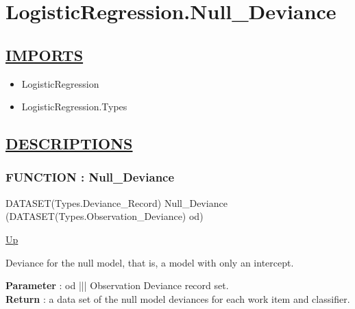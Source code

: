 \chapter*{LogisticRegression.Null\_Deviance}
\hypertarget{ecldoc:toc:LogisticRegression.Null_Deviance}{}

\section*{\underline{IMPORTS}}
\begin{itemize}
\item LogisticRegression
\item LogisticRegression.Types
\end{itemize}

\section*{\underline{DESCRIPTIONS}}
\subsection*{FUNCTION : Null\_Deviance}
\hypertarget{ecldoc:logisticregression.null_deviance}{}
\begin{minipage}[t]{\textwidth}
\begin{flushleft}
DATASET(Types.Deviance\_Record) Null\_Deviance (DATASET(Types.Observation\_Deviance) od)
\end{flushleft}
\end{minipage}
\hyperlink{ecldoc:toc:LogisticRegression}{Up}

\par
Deviance for the null model, that is, a model with only an intercept.
\par
\textbf{Parameter} : od ||| Observation Deviance record set. \\
\textbf{Return} : a data set of the null model deviances for each work item and classifier. \\
